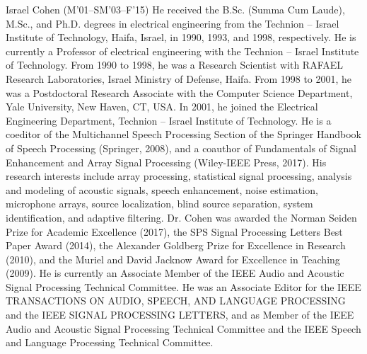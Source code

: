 \documentclass[journal]{IEEEtran}
\begin{document}
% 

\begin{IEEEbiography}{Israel Cohen}
(M’01–SM’03–F’15) He received the B.Sc. (Summa Cum Laude), M.Sc., and Ph.D. degrees in electrical engineering from the Technion – Israel Institute of Technology, Haifa, Israel, in 1990, 1993, and 1998, respectively.
He is currently a Professor of electrical engineering with the Technion – Israel Institute of Technology.
From 1990 to 1998, he was a Research Scientist with RAFAEL Research Laboratories, Israel Ministry of Defense, Haifa. 
From 1998 to 2001, he was a Postdoctoral Research Associate with the Computer Science Department, Yale University, New Haven, CT, USA. In 2001, he joined the Electrical Engineering Department, Technion – Israel Institute of Technology.
He is a coeditor of the Multichannel Speech Processing Section of the Springer Handbook of Speech Processing (Springer, 2008), and a coauthor of Fundamentals of Signal Enhancement and Array Signal Processing (Wiley-IEEE Press, 2017). 
His research interests include array processing, statistical signal processing, analysis and modeling of acoustic signals, speech enhancement, noise estimation, microphone arrays, source localization, blind source separation, system identification, and adaptive filtering.
Dr. Cohen was awarded the Norman Seiden Prize for Academic Excellence (2017), the SPS Signal Processing Letters Best Paper Award (2014), the Alexander Goldberg Prize for Excellence in Research (2010), and the Muriel and David Jacknow Award for Excellence in Teaching (2009). 
He is currently an Associate Member of the IEEE Audio and Acoustic Signal Processing Technical Committee. 
He was an Associate Editor for the IEEE TRANSACTIONS ON AUDIO, SPEECH, AND LANGUAGE PROCESSING and the IEEE SIGNAL PROCESSING LETTERS, and as Member of the IEEE Audio and Acoustic Signal Processing
Technical Committee and the IEEE Speech and Language Processing Technical Committee.
\end{IEEEbiography}
\end{document}
